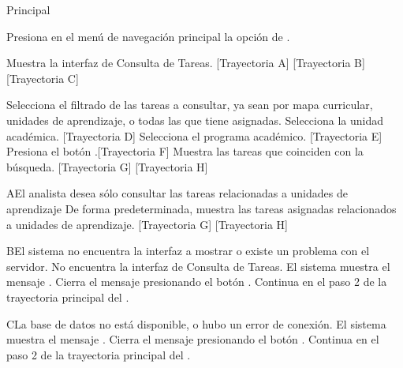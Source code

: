 \begin{UCtrayectoria}{Principal}
    
    \UCpaso[\UCactor] Presiona en el menú de navegación principal la opción de .
    
    \UCpaso Muestra la interfaz de Consulta de Tareas. [Trayectoria A] [Trayectoria B] [Trayectoria C]

    \UCpaso[\UCactor] Selecciona el filtrado de las tareas a consultar, ya sean por mapa curricular, unidades de aprendizaje, o todas las que tiene asignadas.
    \UCpaso[\UCactor] Selecciona la unidad académica. [Trayectoria D]
    \UCpaso[\UCactor] Selecciona el programa académico. [Trayectoria E]
    \UCpaso[\UCactor] Presiona el botón .[Trayectoria F]
    \UCpaso Muestra las tareas que coinciden con la búsqueda. [Trayectoria G] [Trayectoria H] 
    
    
\end{UCtrayectoria}


\begin{UCtrayectoriaA}{A}{El analista desea sólo consultar las tareas relacionadas a unidades de aprendizaje}
    \UCpaso De forma predeterminada, muestra las tareas asignadas relacionados a unidades de aprendizaje. [Trayectoria G] [Trayectoria H] 
\end{UCtrayectoriaA}


\begin{UCtrayectoriaA}{B}{El sistema no encuentra la interfaz a mostrar o existe un problema con el servidor.}
    \UCpaso No encuentra la interfaz de Consulta de Tareas.
    \UCpaso El sistema muestra el mensaje .
    \UCpaso[\UCactor] Cierra el mensaje presionando el botón .
    \UCpaso Continua en el paso 2 de la trayectoria principal del .
\end{UCtrayectoriaA}


\begin{UCtrayectoriaA}{C}{La base de datos no está disponible, o hubo un error de conexión.}
    \UCpaso El sistema muestra el mensaje .
    \UCpaso[\UCactor] Cierra el mensaje presionando el botón .
    \UCpaso Continua en el paso 2 de la trayectoria principal del .
\end{UCtrayectoriaA}

